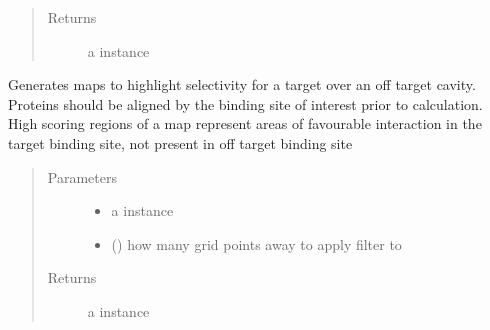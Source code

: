 \documentclass[letterpaper,10pt,english]{sphinxmanual}
\begin{document}
\begin{fulllineitems}
\begin{fulllineitems}
\begin{quote}
\begin{description}
\begin{itemize}
\end{itemize}

\item[{Returns}] \leavevmode
a {\hyperref[\detokenize{result_api:hotspots.result.Results}]{}} instance

\end{description}\end{quote}

\end{fulllineitems}


\begin{fulllineitems}
\label{\detokenize{result_api:hotspots.result.Results.get_difference_map}}
Generates maps to highlight selectivity for a target over an off target cavity. Proteins should be aligned
by the binding site of interest prior to calculation.
High scoring regions of a map represent areas of favourable interaction in the target binding site, not
present in off target binding site
\begin{quote}\begin{description}
\item[{Parameters}] \leavevmode\begin{itemize}
\item {} 
 \textendash{} a {\hyperref[\detokenize{result_api:hotspots.result.Results}]{}} instance

\item {} 
 () \textendash{} how many grid points away to apply filter to

\end{itemize}

\item[{Returns}] \leavevmode
a {\hyperref[\detokenize{result_api:hotspots.result.Results}]{}} instance

\end{description}\end{quote}


\end{fulllineitems}
\end{fulllineitems}
\end{document}
